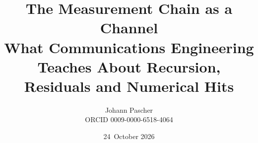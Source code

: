 \documentclass[11pt,a4paper]{report}
\title{The Measurement Chain as a Channel\\[0.5em]
  \large What Communications Engineering Teaches About Recursion, Residuals and Numerical Hits}
\date{24~October 2026}
\author{Johann Pascher\\\small ORCID 0009-0000-6518-4064}
\begin{document}
\renewcommand{\thechapter}{}
\renewcommand{\thesection}{\arabic{section}}
\maketitle
\tableofcontents

\end{document}
